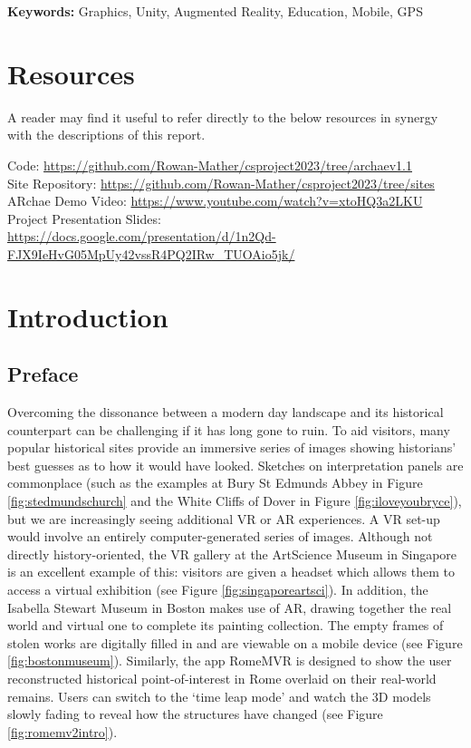 \documentclass[12pt, a4paper]{article}
\begin{document}
\begin{center}
\textbf{Keywords:} Graphics, Unity, Augmented Reality, Education, Mobile, GPS
\end{center}

\newpage

\printglossary

\section*{Resources}
A reader may find it useful to refer directly to the below resources in synergy with the descriptions of this report.

Code: \url{https://github.com/Rowan-Mather/csproject2023/tree/archaev1.1} \cite{tools:repo} \\
Site Repository: \url{https://github.com/Rowan-Mather/csproject2023/tree/sites} \cite{tools:repo} \\
ARchae Demo Video: \url{https://www.youtube.com/watch?v=xtoHQ3a2LKU} \cite{design:videodemo} \\
Project Presentation Slides: \\
\url{https://docs.google.com/presentation/d/1n2Qd-FJX9IeHvG05MpUy42vssR4PQ2IRw_TUOAio5jk/}

\newpage

\tableofcontents

\newpage

\section{Introduction}

\subsection{Preface}
Overcoming the dissonance between a modern day landscape and its historical counterpart can be challenging if it has long gone to ruin. To aid visitors, many popular historical sites provide an immersive series of images showing historians' best guesses as to how it would have looked. Sketches on interpretation panels are commonplace (such as the examples at Bury St Edmunds Abbey in Figure \ref{fig:stedmundschurch} and the White Cliffs of Dover in Figure \ref{fig:iloveyoubryce}), but we are increasingly seeing additional \gls{VR} or \gls{AR} experiences. A VR set-up would involve an entirely computer-generated series of images. Although not directly history-oriented, the VR gallery at the ArtScience Museum in Singapore is an excellent example of this: visitors are given a headset which allows them to access a virtual exhibition (see Figure \ref{fig:singaporeartsci}). In addition, the Isabella Stewart Museum in Boston makes use of AR, drawing together the real world and virtual one to complete its painting collection. The empty frames of stolen works are digitally filled in and are viewable on a mobile device (see Figure \ref{fig:bostonmuseum}). Similarly, the app RomeMVR is designed to show the user reconstructed historical point-of-interest in Rome overlaid on their real-world remains. Users can switch to the `time leap mode' and watch the 3D models slowly fading to reveal how the structures have changed (see Figure \ref{fig:romemv2intro}). 
\end{document}
